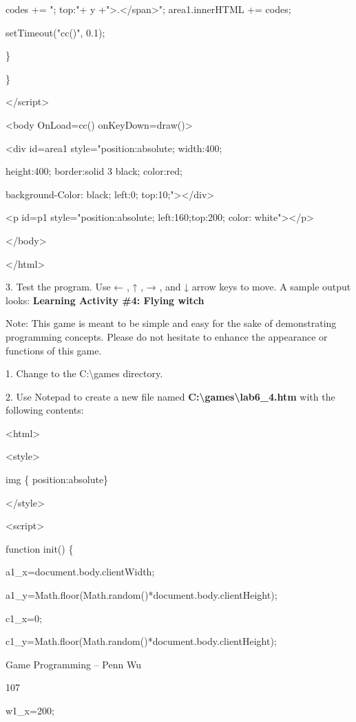 \documentclass[
]{article}
\begin{document}
codes += "; top:"+ y
+"\textquotesingle\textgreater.\textless/span\textgreater";
area1.innerHTML += codes;

setTimeout("cc()", 0.1);

\}

\}

\textless/script\textgreater{}

\textless body OnLoad=cc() onKeyDown=draw()\textgreater{}

\textless div id=area1 style="position:absolute; width:400;

height:400; border:solid 3 black; color:red;

background-Color: black; left:0;
top:10;"\textgreater\textless/div\textgreater{}

\textless p id=p1 style="position:absolute; left:160;top:200; color:
white"\textgreater\textless/p\textgreater{}

\textless/body\textgreater{}

\textless/html\textgreater{}

3. Test the program. Use ← , ↑ , → , and ↓ arrow keys to move. A sample
output looks: \textbf{Learning Activity \#4: Flying witch}

Note: This game is meant to be simple and easy for the sake of
demonstrating programming concepts. Please do not hesitate to enhance
the appearance or functions of this game.

1. Change to the C:\textbackslash games directory.

2. Use Notepad to create a new file named
\textbf{C:\textbackslash games\textbackslash lab6\_4.htm} with the
following contents:

\textless html\textgreater{}

\textless style\textgreater{}

img \{ position:absolute\}

\textless/style\textgreater{}

\textless script\textgreater{}

function init() \{

a1\_x=document.body.clientWidth;

a1\_y=Math.floor(Math.random()*document.body.clientHeight);

c1\_x=0;

c1\_y=Math.floor(Math.random()*document.body.clientHeight);

Game Programming -- Penn Wu

107

\protect\hypertarget{index_split_007.htmlux5cux23p108}{}{}w1\_x=200;
\end{document}

